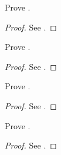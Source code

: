 \exercisesection

\begin{ex}\label{i:ex:11.2.1}
  Prove .
\end{ex}

\begin{proof}
  See .
\end{proof}

\begin{ex}\label{i:ex:11.2.2}
  Prove .
\end{ex}

\begin{proof}
  See .
\end{proof}

\begin{ex}\label{i:ex:11.2.3}
  Prove .
\end{ex}

\begin{proof}
  See .
\end{proof}

\begin{ex}\label{i:ex:11.2.4}
  Prove .
\end{ex}

\begin{proof}
  See .
\end{proof}
